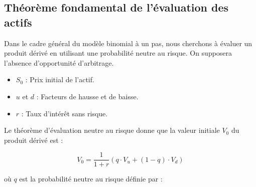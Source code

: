 \documentclass[12pt,a4paper]{article}
\begin{document}
\vspace{0.5cm}

\begin{center}
\end{center}

\subsection{Théorème fondamental de l'évaluation des actifs}

Dans le cadre général du modèle binomial à un pas, nous cherchons à évaluer un produit dérivé en utilisant une probabilité neutre au risque. On supposera l'absence d'opportunité d'arbitrage.

\begin{itemize}
    \item \( S_0 \) : Prix initial de l'actif.
    \item \( u \) et \( d \) : Facteurs de hausse et de baisse.
    \item \( r \) : Taux d'intérêt sans risque.
\end{itemize}

Le théorème d'évaluation neutre au risque donne que la valeur initiale \( V_0 \) du produit dérivé est :

\begin{equation}
    \boxed{V_0 = \frac{1}{1 + r} \left( q \cdot V_u + (1 - q) \cdot V_d \right)}
\end{equation}

où \( q \) est la probabilité neutre au risque définie par :
\end{document}
